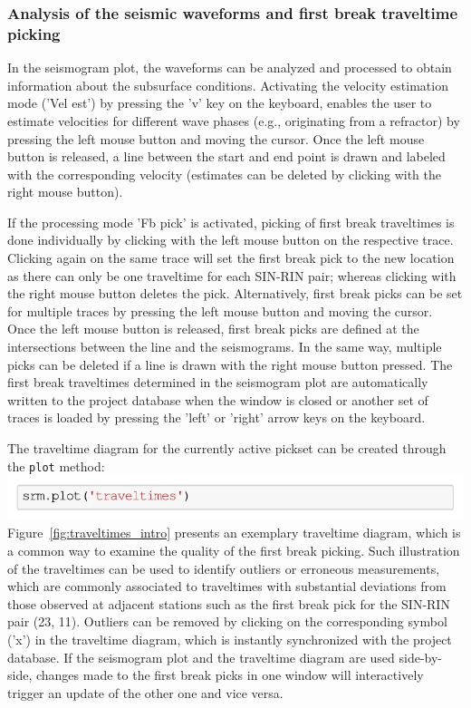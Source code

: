 \documentclass[a4paper,fleqn]{cas-sc}
\begin{document}
\subsubsection{Analysis of the seismic waveforms and first break traveltime picking}

In the seismogram plot, the waveforms can be analyzed and processed to obtain information about the subsurface conditions. Activating the velocity estimation mode ('Vel est') by pressing the 'v' key on the keyboard, enables the user to estimate velocities for different wave phases (e.g., originating from a refractor) by pressing the left mouse button and moving the cursor. Once the left mouse button is released, a line between the start and end point is drawn and labeled with the corresponding velocity (estimates can be deleted by clicking with the right mouse button).

If the processing mode 'Fb pick' is activated, picking of first break traveltimes is done individually by clicking with the left mouse button on the respective trace. Clicking again on the same trace will set the first break pick to the new location as there can only be one traveltime for each SIN-RIN pair; whereas clicking with the right mouse button deletes the pick. Alternatively, first break picks can be set for multiple traces by pressing the left mouse button and moving the cursor. 
Once the left mouse button is released, first break picks are defined at the intersections between the line and the seismograms. In the same way, multiple picks can be deleted if a line is drawn with the right mouse button pressed. The first break traveltimes determined in the seismogram plot are automatically written to the project database when the window is closed or another set of traces is loaded by pressing the 'left' or 'right' arrow keys on the keyboard. 

The traveltime diagram for the currently active pickset can be created through the \texttt{plot} method:
\newline
\includegraphics[width=.5\textwidth]{./figures/plot_traveltimes.pdf}
\newline
Figure~\ref{fig:traveltimes_intro} presents an exemplary traveltime diagram, which is a common way to examine the quality of the first break picking. Such illustration of the traveltimes can be used to identify outliers or erroneous measurements, which are commonly associated to traveltimes with substantial deviations from those observed at adjacent stations such as the first break pick for the SIN-RIN pair (23, 11). Outliers can be removed by clicking on the corresponding symbol ('x') in the traveltime diagram, which is instantly synchronized with the project database. If the seismogram plot and the traveltime diagram are used side-by-side, changes made to the first break picks in one window will interactively trigger an update of the other one and vice versa.
\end{document}
